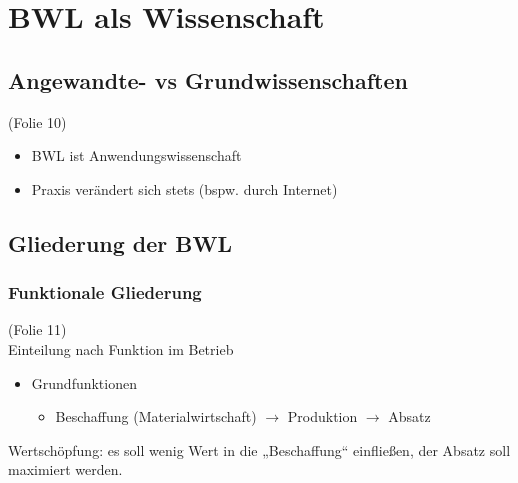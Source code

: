 






\maketitle
\newpage
\tableofcontents
\newpage


\section{BWL als Wissenschaft}
\subsection{Angewandte- vs Grundwissenschaften}
(Folie 10)
\begin{itemize}
\item BWL ist Anwendungswissenschaft
\item Praxis verändert sich stets (bspw. durch Internet)
\end{itemize}
\subsection{Gliederung der BWL}
\subsubsection{Funktionale Gliederung}
(Folie 11)\\
Einteilung nach Funktion im Betrieb
\begin{itemize}
\item Grundfunktionen
\begin{itemize}
\item Beschaffung (Materialwirtschaft) $\rightarrow$ Produktion $\rightarrow$ Absatz
\end{itemize}
\end{itemize}
Wertschöpfung: es soll wenig Wert in die „Beschaffung“ einfließen, der Absatz soll maximiert werden.
